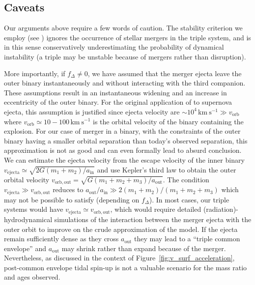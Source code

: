 \documentclass{aa}
\DeclareRobustCommand{\Figref}[1]{Figure~\ref{#1}}
\begin{document}
 \subsection{Caveats}
\label{sec:caveats_triple}
Our arguments above require a few words of caution. The stability
criterion we employ (see \citealt{vynatheya:23}) ignores the
occurrence of stellar mergers in the triple system, and is in this
sense conservatively underestimating the probability of dynamical
instability (a triple may be unstable because of mergers rather than
disruption).

More importantly, if $f_\Delta\neq0$, we have assumed that the merger
ejecta leave the outer binary instantaneously and without
interacting with the third companion. These assumptions result in an
instantaneous widening and an increase in eccentricity of the outer
binary. For the
original application of \cite{blaauw:61} to supernova ejecta, this
assumption is justified since ejecta velocity are
$\sim10^4\,\mathrm{km\ s^{-1}} \gg v_\mathrm{orb}$ where
$v_\mathrm{orb}\simeq10-100\,\mathrm{km\ s^{-1}}$ is the orbital
velocity of the binary containing the explosion. For our case of
merger in a binary, with the constraints of the outer binary having a
smaller orbital separation than today's observed separation,
this approximation is not as good and can even formally lead to
absurd conclusion. We can estimate the ejecta velocity from the escape velocity
of the inner binary
$v_\mathrm{ejecta}\simeq \sqrt{2 G (m_1+m_2)/a_\mathrm{in}}$ and use
Kepler's third law to obtain the outer orbital velocity
$v_\mathrm{orb, out}=\sqrt{G(m_1+m_2+m_3)/a_\mathrm{out}}$. The
condition $v_\mathrm{ejecta}\gg v_\mathrm{orb, out}$ reduces to
$a_\mathrm{out}/a_\mathrm{in} \gg 2(m_1+m_2)/(m_1+m_2+m_3)$ which may
not be possible to satisfy (depending on $f_\Delta$). In most cases,
our triple systems would have
$v_\mathrm{ejecta}\simeq v_\mathrm{orb, out}$, which would require
detailed (radiation)-hydrodynamical simulations of the interaction between
the merger ejecta with the outer orbit to improve on the crude
approximation of the \cite{blaauw:61} model. If the ejecta remain
sufficiently dense as they cross $a_\mathrm{out}$ they may lead to a
``triple common envelope'' \citep[e.g.,][]{toonen:20} and
$a_\mathrm{out}$ may shrink rather than expand because of the merger.
Nevertheless, as discussed in the context of \Figref{fig:v_surf_acceleration}, post-common envelope tidal spin-up is not a valuable scenario for the mass ratio and ages observed.
\end{document}
